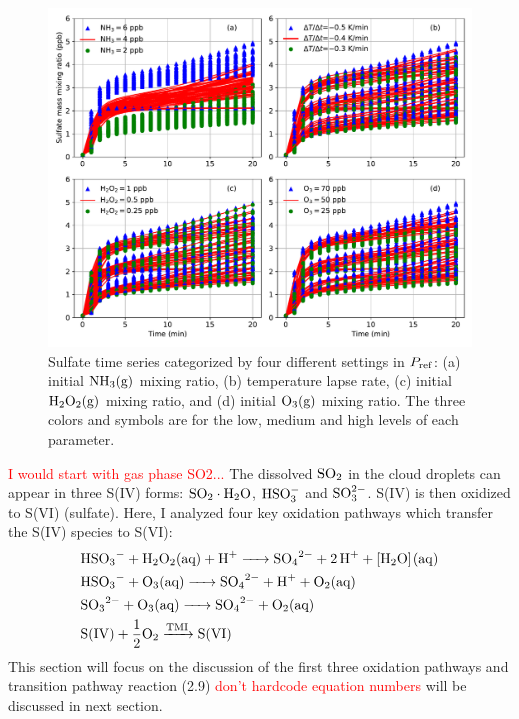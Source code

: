 \documentclass[edeposit,fullpage]{uiucthesis2009}
\begin{document}
\begin{figure}[ht]
    \centering \includegraphics[scale=0.6]{chap2_figs/chap2_fig2_mono_ensemble.pdf}
    \caption{Sulfate time series categorized by four different
      settings in $P_{\rm ref}$: (a) initial $\rm NH_3(g)$ mixing
      ratio, (b) temperature lapse rate, (c) initial $\rm H_2O_2(g)$
      mixing ratio, and (d) initial $\rm O_3(g)$ mixing ratio. The
      three colors and symbols are for the low, medium and high levels
      of each parameter.}
    \label{chap2:ens_three}
\end{figure}

\textcolor{red}{I would start with gas phase SO2...}  The dissolved
$\rm SO_2$ in the cloud droplets can appear in three S(IV) forms: $\rm
SO_2\cdot H_2O$, $\rm HSO_3^-$ and $\rm SO_3^{2-}$. S(IV) is then
oxidized to S(VI) (sulfate). Here, I analyzed four key oxidation
pathways which transfer the S(IV) species to S(VI):
\begin{align}
\centering
    &\ce{HSO3^- + H2O2{(aq)} + H^+ -> SO4^{2-} + 2H^+ + [H2O](aq)}\\
    &\ce{HSO3^- + O3{(aq)} -> SO4^{2-} + H^+ + O2{(aq)}} \\
    &\ce{SO3^{2-} + O3{(aq)} -> SO4^{2-} + O2{(aq)}} \\
    &\ce{S(IV) + \frac{1}{2}O2 ->[TMI] S(VI)}
\label{eq:chem-eq}
\end{align}
This section will focus on the discussion of the first three oxidation
pathways and transition pathway reaction (2.9) \textcolor{red}{don't
  hardcode equation numbers} will be discussed in next section.
\end{document}

